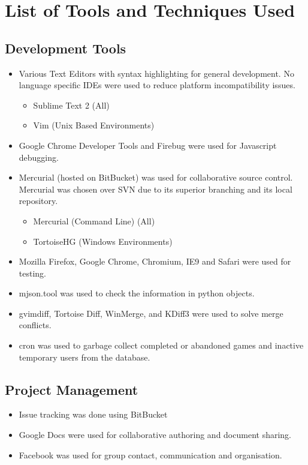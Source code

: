 \section{List of Tools and Techniques Used}
\subsection{Development Tools}
\begin{itemize}
	\setlength{\itemsep}{1pt}
  	\setlength{\parskip}{0pt}
  	\setlength{\parsep}{0pt}
	\item Various Text Editors with syntax highlighting for general development. No language specific IDEs were used to reduce platform incompatibility issues.
	\begin{itemize}
		\setlength{\itemsep}{1pt}
  		\setlength{\parskip}{0pt}
  		\setlength{\parsep}{0pt}
		\item {Sublime Text 2 (All)}
		\item {Vim (Unix Based Environments)}
	\end{itemize}
	\item Google Chrome Developer Tools and Firebug were used for Javascript debugging.
	\item Mercurial (hosted on BitBucket) was used for collaborative source control. Mercurial was chosen over SVN due to its superior branching and its local repository.
	\begin{itemize}
		\setlength{\itemsep}{1pt}
  		\setlength{\parskip}{0pt}
  		\setlength{\parsep}{0pt}
		\item {Mercurial (Command Line) (All)}
		\item {TortoiseHG (Windows Environments)}
	\end{itemize}
	\item Mozilla Firefox, Google Chrome, Chromium, IE9 and Safari were used for testing.
	\item mjson.tool was used to check the information in python objects.
	\item gvimdiff, Tortoise Diff, WinMerge, and KDiff3 were used to solve merge conflicts.
	\item cron was used to garbage collect completed or abandoned games and inactive temporary users from the database.
\end{itemize}
	
\subsection{Project Management}
\begin{itemize}
	\setlength{\itemsep}{1pt}
  	\setlength{\parskip}{0pt}
  	\setlength{\parsep}{0pt}
	\item Issue tracking was done using BitBucket
	\item Google Docs were used for collaborative authoring and document sharing.
	\item Facebook was used for group contact, communication and organisation.
\end{itemize}

